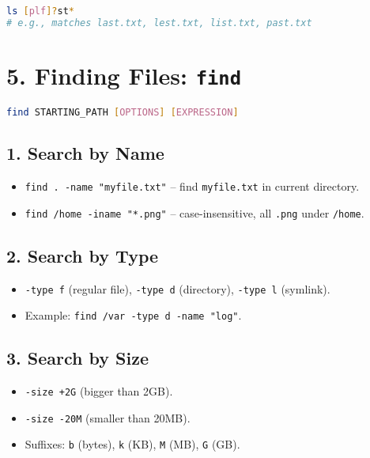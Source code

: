 \documentclass[a4paper]{report}
\begin{document}
\begin{lstlisting}[language=bash]
ls [plf]?st*
# e.g., matches last.txt, lest.txt, list.txt, past.txt
\end{lstlisting}

\section*{5. Finding Files: \texttt{find}}
\begin{lstlisting}[language=bash]
find STARTING_PATH [OPTIONS] [EXPRESSION]
\end{lstlisting}

\subsection*{1. Search by Name}
\begin{itemize}
    \item \texttt{find . -name "myfile.txt"} -- find \texttt{myfile.txt} in current directory.
    \item \texttt{find /home -iname "*.png"} -- case-insensitive, all \texttt{.png} under \texttt{/home}.
\end{itemize}

\subsection*{2. Search by Type}
\begin{itemize}
    \item \texttt{-type f} (regular file), \texttt{-type d} (directory), \texttt{-type l} (symlink).
    \item Example: \texttt{find /var -type d -name "log"}.
\end{itemize}

\subsection*{3. Search by Size}
\begin{itemize}
    \item \texttt{-size +2G} (bigger than 2GB).
    \item \texttt{-size -20M} (smaller than 20MB).
    \item Suffixes: \texttt{b} (bytes), \texttt{k} (KB), \texttt{M} (MB), \texttt{G} (GB).
\end{itemize}
\end{document}
